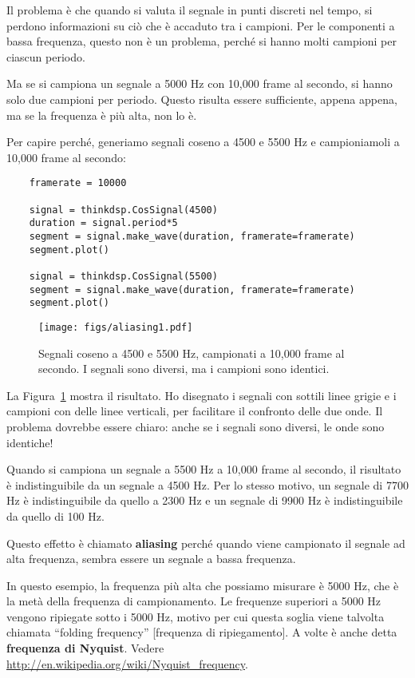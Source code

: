 \documentclass[12pt,a4paper]{book}
\begin{document}
Il problema è che quando si valuta il segnale in punti discreti nel tempo, si perdono informazioni su ciò che è accaduto tra i campioni. Per le componenti a bassa frequenza, questo non è un problema, perché si hanno molti campioni per ciascun periodo.

Ma se si campiona un segnale a 5000 Hz con 10,000 frame al secondo, si hanno solo due campioni per periodo. Questo risulta essere sufficiente, appena appena, ma se la frequenza è più alta, non lo è.

Per capire perché, generiamo segnali coseno a 4500 e 5500 Hz e campioniamoli a 10,000 frame al secondo:

\begin{verbatim} 
    framerate = 10000

    signal = thinkdsp.CosSignal(4500)
    duration = signal.period*5
    segment = signal.make_wave(duration, framerate=framerate)
    segment.plot()

    signal = thinkdsp.CosSignal(5500)
    segment = signal.make_wave(duration, framerate=framerate)
    segment.plot()
 \end{verbatim} 

\begin{figure} 

\centerline{\texttt{[image: figs/aliasing1.pdf]}} \caption{Segnali coseno a 4500 e 5500 Hz, campionati a 10,000 frame al secondo. I segnali sono diversi, ma i campioni sono identici.} \label{fig.aliasing1} \end{figure} 

La Figura~\ref{fig.aliasing1} mostra il risultato. Ho disegnato i segnali con sottili linee grigie e i campioni con delle linee verticali, per facilitare il confronto delle due onde. Il problema dovrebbe essere chiaro: anche se i segnali sono diversi, le onde sono identiche!

Quando si campiona un segnale a 5500 Hz a 10,000 frame al secondo, il risultato è indistinguibile da un segnale a 4500 Hz. Per lo stesso motivo, un segnale di 7700 Hz è indistinguibile da quello a 2300 Hz e un segnale di 9900 Hz è indistinguibile da quello di 100 Hz.

Questo effetto è chiamato {\bf aliasing} perché quando viene campionato il segnale ad alta frequenza, sembra essere un segnale a bassa frequenza.

In questo esempio, la frequenza più alta che possiamo misurare è 5000 Hz, che è la metà della frequenza di campionamento. Le frequenze superiori a 5000 Hz vengono ripiegate sotto i 5000 Hz, motivo per cui questa soglia viene talvolta chiamata ``folding frequency'' [frequenza di ripiegamento]. A volte è anche detta {\bf frequenza di Nyquist}. Vedere \url{http://en.wikipedia.org/wiki/Nyquist_frequency}.
\end{document}
